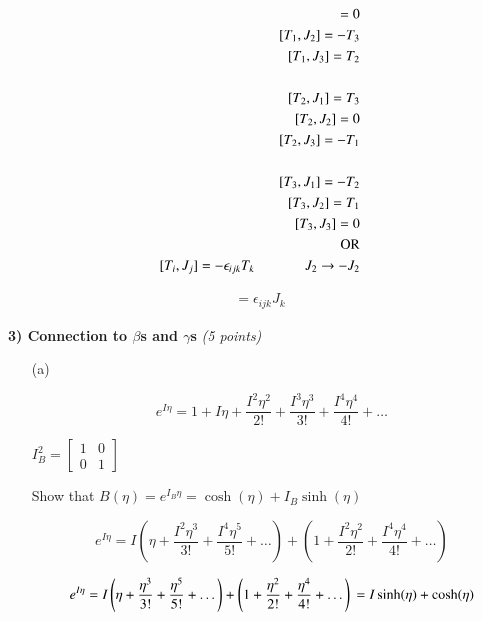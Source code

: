 {\begin{itemize}
{\begin{align*}
[T_1,J_1] = 0  \\
[T_1,J_2] = -T_3 \\
[T_1,J_3] = T_2 \\
\\
[T_2,J_1] = T_3\\
[T_2,J_2] = 0 \\
[T_2,J_3] = -T_1 \\
\\
[T_3,J_1] = -T_2 \\
[T_3,J_2] = T_1 \\
[T_3,J_3] = 0 \\
\textrm{OR}\\
[T_i,J_j] = -\epsilon_{ijk} T_k  \hspace{0.5in} J_2 \rightarrow -J_2
\end{align*}

\begin{align*}
[J_i,J_j] = \epsilon_{ijk} J_k 
\end{align*}


}

\end{itemize}

\vspace*{0.25in}


\textbf{3) Connection to $\beta$s and  $\gamma$s} \hfill \textit{(5 points)}
\begin{itemize}
\item[(a)]{

\begin{equation*}
e^{I\eta} = 1 + I\eta + \frac{I^2\eta^2}{2!} + \frac{I^3\eta^3}{3!} + \frac{I^4\eta^4}{4!} + \dots
\end{equation*}

$I_B^2 = \begin{bmatrix} 1 & 0  \\ 0 & 1 \end{bmatrix} $

Show that $B(\eta) = e^{I_B\eta} = \cosh(\eta)+ I_B \sinh(\eta)$


\begin{equation*}
e^{I\eta} = I\left(\eta + \frac{I^2\eta^3}{3!} + \frac{I^4\eta^5}{5!} + \dots \right) + \left(1 + \frac{I^2\eta^2}{2!} + \frac{I^4\eta^4}{4!}  + \dots \right)
\end{equation*}

\begin{equation*}
e^{I\eta} = I\left(\eta + \frac{\eta^3}{3!} + \frac{\eta^5}{5!} + \dots \right) + \left(1 + \frac{\eta^2}{2!} + \frac{\eta^4}{4!}  + \dots \right) \\
= I \sinh(\eta) + \cosh(\eta)
\end{equation*}

}
\end{itemize}}
